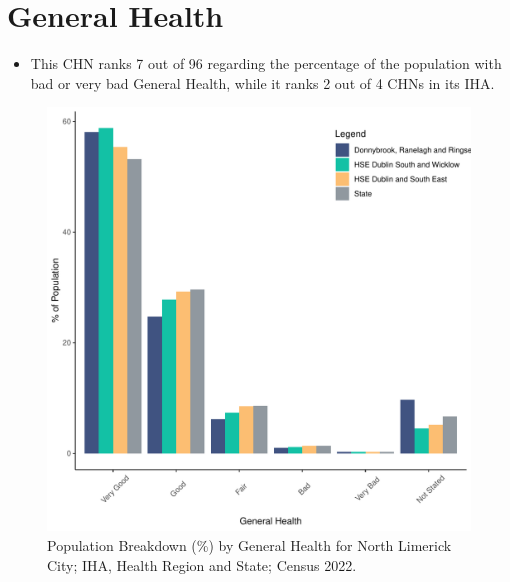 \documentclass{article}
\begin{document}
\pagebreak

\section{General Health}\label{sect:GenHealth}
\begin{itemize}
\item  This CHN ranks  7 out of 96 regarding the percentage of the population with bad or very bad General Health, while it ranks   2 out of 4 CHNs in its IHA.
\end{itemize}
\begin{figure}[h]
	\centering
	\includegraphics[width = 150mm]{../figures/GenED.pdf}
	\caption{Population Breakdown (\%) by General Health for North Limerick City; IHA, Health Region and State;  Census 2022.}
	\label{fig:2ae19629-1a6a-13a3-e055-000000000001}
	\end{figure}
\end{document}
